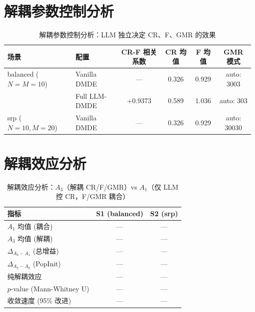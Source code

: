 \documentclass{article}
\begin{document}
\section*{解耦参数控制分析}

\begin{table}[htbp]
\centering
\caption{解耦参数控制分析：LLM 独立决定 CR、F、GMR 的效果}
\label{tab:decoupled_params}
\begin{tabular}{llcccc}
\toprule
场景 & 配置 & CR-F 相关系数 & CR 均值 & F 均值 & GMR 模式 \\
\midrule
balanced ($N=M=10$) & Vanilla DMDE & --- & 0.326 & 0.929 & auto: 3003 \\
 & Full LLM-DMDE & +0.9373 & 0.589 & 1.036 & auto: 303 \\
\midrule
srp ($N=10, M=20$) & Vanilla DMDE & --- & 0.326 & 0.929 & auto: 30030 \\
\bottomrule
\end{tabular}
\end{table}

\section*{解耦效应分析}

\begin{table}[htbp]
\centering
\caption{解耦效应分析：$A_3$（解耦 CR/F/GMR）vs $A_1$（仅 LLM 控 CR，F/GMR 耦合）}
\label{tab:decoupling_effect}
\begin{tabular}{lcc}
\toprule
指标 & S1 (balanced) & S2 (srp) \\
\midrule
$A_1$ 均值 (耦合) & --- & --- \\
$A_3$ 均值 (解耦) & --- & --- \\
$\Delta_{A_3-A_1}$ (总增益) & --- & --- \\
$\Delta_{A_2-A_0}$ (PopInit) & --- & --- \\
纯解耦效应 & --- & --- \\
$p$-value (Mann-Whitney U) & --- & --- \\
收敛速度 (95\% 改进) & --- & --- \\
\bottomrule
\end{tabular}
\end{table}
\end{document}
